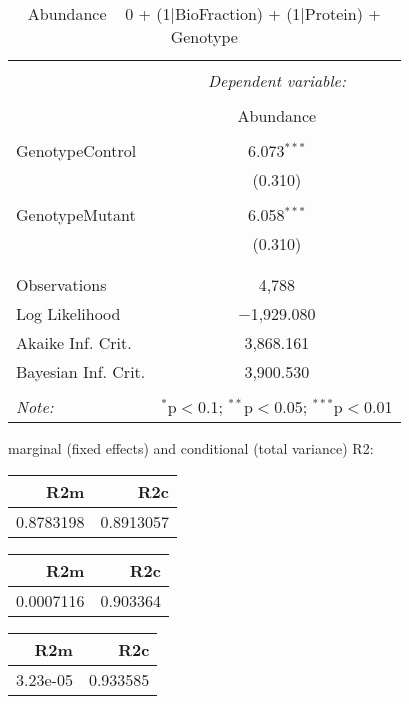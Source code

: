 \documentclass[11pt]{report}
\begin{document}
\begin{table}[!htbp] \centering 
  \caption{Abundance ~ 0 + (1|BioFraction) + (1|Protein) + Genotype} 
  \label{} 
\begin{tabular}{@{\extracolsep{5pt}}lc} 
\\[-1.8ex]\hline 
\hline \\[-1.8ex] 
 & \multicolumn{1}{c}{\textit{Dependent variable:}} \\ 
\cline{2-2} 
\\[-1.8ex] & Abundance \\ 
\hline \\[-1.8ex] 
 GenotypeControl & 6.073$^{***}$ \\ 
  & (0.310) \\ 
  & \\ 
 GenotypeMutant & 6.058$^{***}$ \\ 
  & (0.310) \\ 
  & \\ 
\hline \\[-1.8ex] 
Observations & 4,788 \\ 
Log Likelihood & $-$1,929.080 \\ 
Akaike Inf. Crit. & 3,868.161 \\ 
Bayesian Inf. Crit. & 3,900.530 \\ 
\hline 
\hline \\[-1.8ex] 
\textit{Note:}  & \multicolumn{1}{r}{$^{*}$p$<$0.1; $^{**}$p$<$0.05; $^{***}$p$<$0.01} \\ 
\end{tabular} 
\end{table} 
marginal (fixed effects) and conditional (total variance) R2:

\begin{tabular}{r|r}
\hline
R2m & R2c\\
\hline
0.8783198 & 0.8913057\\
\hline
\end{tabular}

\begin{tabular}{r|r}
\hline
R2m & R2c\\
\hline
0.0007116 & 0.903364\\
\hline
\end{tabular}

\begin{tabular}{r|r}
\hline
R2m & R2c\\
\hline
3.23e-05 & 0.933585\\
\hline
\end{tabular}
\end{document}
